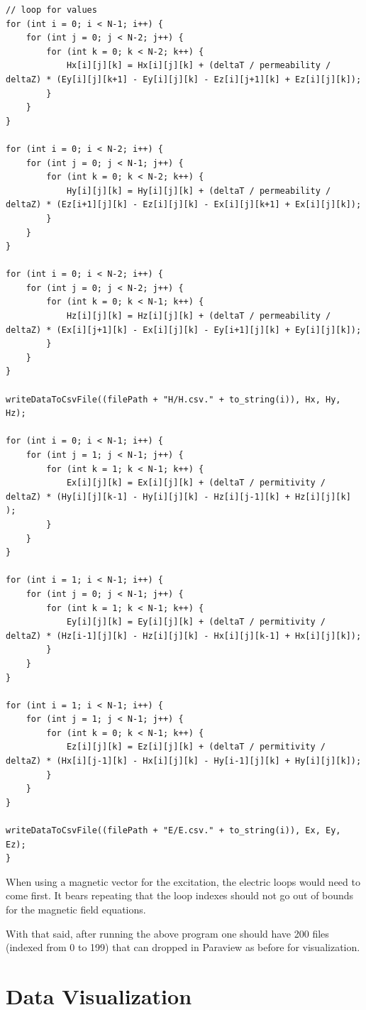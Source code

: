 \begin{verbatim}
// loop for values
for (int i = 0; i < N-1; i++) {
	for (int j = 0; j < N-2; j++) {
		for (int k = 0; k < N-2; k++) {
			Hx[i][j][k] = Hx[i][j][k] + (deltaT / permeability / deltaZ) * (Ey[i][j][k+1] - Ey[i][j][k] - Ez[i][j+1][k] + Ez[i][j][k]);
		}
	}
}

for (int i = 0; i < N-2; i++) {
	for (int j = 0; j < N-1; j++) {
		for (int k = 0; k < N-2; k++) {
			Hy[i][j][k] = Hy[i][j][k] + (deltaT / permeability / deltaZ) * (Ez[i+1][j][k] - Ez[i][j][k] - Ex[i][j][k+1] + Ex[i][j][k]);
		}
	}
}

for (int i = 0; i < N-2; i++) {
	for (int j = 0; j < N-2; j++) {
		for (int k = 0; k < N-1; k++) {
			Hz[i][j][k] = Hz[i][j][k] + (deltaT / permeability / deltaZ) * (Ex[i][j+1][k] - Ex[i][j][k] - Ey[i+1][j][k] + Ey[i][j][k]);
		}
	}
}

writeDataToCsvFile((filePath + "H/H.csv." + to_string(i)), Hx, Hy, Hz);

for (int i = 0; i < N-1; i++) {
	for (int j = 1; j < N-1; j++) {
		for (int k = 1; k < N-1; k++) {
			Ex[i][j][k] = Ex[i][j][k] + (deltaT / permitivity / deltaZ) * (Hy[i][j][k-1] - Hy[i][j][k] - Hz[i][j-1][k] + Hz[i][j][k] );
		}
	}
}

for (int i = 1; i < N-1; i++) {
	for (int j = 0; j < N-1; j++) {
		for (int k = 1; k < N-1; k++) {
			Ey[i][j][k] = Ey[i][j][k] + (deltaT / permitivity / deltaZ) * (Hz[i-1][j][k] - Hz[i][j][k] - Hx[i][j][k-1] + Hx[i][j][k]);
		}
	}
}

for (int i = 1; i < N-1; i++) {
	for (int j = 1; j < N-1; j++) {
		for (int k = 0; k < N-1; k++) {
			Ez[i][j][k] = Ez[i][j][k] + (deltaT / permitivity / deltaZ) * (Hx[i][j-1][k] - Hx[i][j][k] - Hy[i-1][j][k] + Hy[i][j][k]);
		}
	}
}

writeDataToCsvFile((filePath + "E/E.csv." + to_string(i)), Ex, Ey, Ez);
}
\end{verbatim}

When using a magnetic vector for the excitation, the electric loops would need to come first. It bears repeating that the loop indexes should not go out of bounds for the magnetic field equations.

With that said, after running the above program one should have 200 files (indexed from 0 to 199) that can dropped in Paraview as before for visualization.

\section{Data Visualization}

